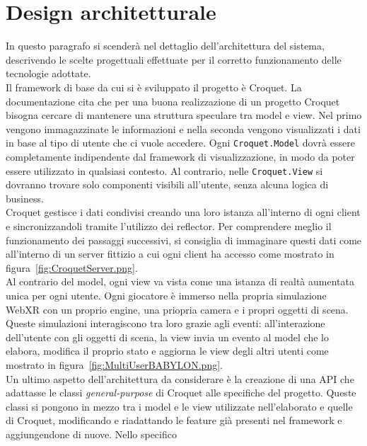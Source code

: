 \section{Design architetturale}\label{sec:design}
In questo paragrafo si scenderà nel dettaglio dell'architettura del sistema, descrivendo le scelte progettuali effettuate per il corretto funzionamento delle tecnologie adottate.\\
\newline
Il framework di base da cui si è sviluppato il progetto è Croquet. La documentazione cita che per una buona realizzazione di un progetto Croquet bisogna cercare di mantenere una 
struttura speculare tra model e view. Nel primo vengono immagazzinate le informazioni e nella seconda vengono visualizzati i dati in base al tipo di utente che ci vuole accedere.
Ogni \texttt{Croquet.Model} dovrà essere completamente indipendente dal framework di visualizzazione, in modo da poter essere utilizzato in qualsiasi contesto. Al contrario, nelle
\texttt{Croquet.View} si dovranno trovare solo componenti visibili all'utente, senza alcuna logica di business.\\
Croquet gestisce i dati condivisi creando una loro istanza all'interno di ogni client e sincronizzandoli tramite l'utilizzo dei reflector. Per comprendere meglio il funzionamento
dei passaggi successivi, si consiglia di immaginare questi dati come all'interno di un server fittizio a cui ogni client ha accesso come mostrato in figura~\ref{fig:CroquetServer.png}.\\
Al contrario del model, ogni view va vista come una istanza di realtà aumentata unica per ogni utente. Ogni giocatore è immerso nella propria simulazione WebXR con un proprio engine,
una priopria camera e i propri oggetti di scena. Queste simulazioni interagiscono tra loro grazie agli eventi: all'interazione dell'utente con gli oggetti di scena, la view invia un
evento al model che lo elabora, modifica il proprio stato e aggiorna le view degli altri utenti come mostrato in figura~\ref{fig:MultiUserBABYLON.png}.\\
\newline
Un ultimo aspetto dell'architettura da considerare è la creazione di una API che adattasse le classi \textit{general-purpose} di Croquet alle specifiche del progetto. Queste classi si pongono
in mezzo tra i model e le view utilizzate nell'elaborato e quelle di Croquet, modificando e riadattando le feature già presenti nel framework e aggiungendone di nuove. Nello specifico
